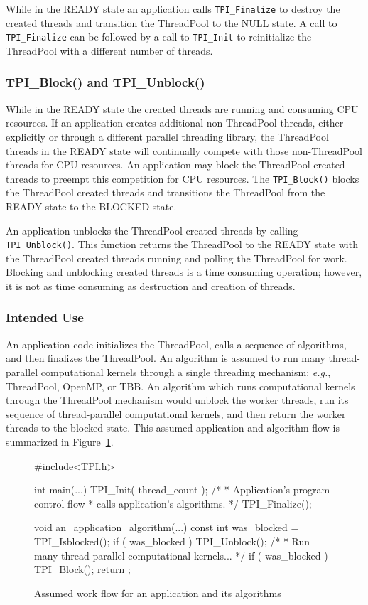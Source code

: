 While in the READY state an application calls \texttt{TPI\_Finalize} to destroy the created threads and transition the ThreadPool to the NULL state.
%
A call to \texttt{TPI\_Finalize} can be followed by a call to \texttt{TPI\_Init} to reinitialize the ThreadPool with a different number of threads.


\subsubsection{TPI\_Block() and TPI\_Unblock()}

While in the READY state the created threads are running and consuming CPU resources.
%
If an application creates additional non-ThreadPool threads, either explicitly or through a different parallel threading library, the ThreadPool threads in the READY state will continually compete with those non-ThreadPool threads for CPU resources.
%
An application may block the ThreadPool created threads to preempt this competition for CPU resources.
%
The \texttt{TPI\_Block()} blocks the ThreadPool created threads and transitions the ThreadPool from the READY state to the BLOCKED state.


An application unblocks the ThreadPool created threads by calling \texttt{TPI\_Unblock()}.
%
This function returns the ThreadPool to the READY state with the ThreadPool created threads running and polling the ThreadPool for work.
%
Blocking and unblocking created threads is a time consuming operation; however, it is not as time consuming as destruction and creation of threads.


\subsubsection{Intended Use}

An application code initializes the ThreadPool, calls a sequence of algorithms, and then finalizes the ThreadPool.
%
An algorithm is assumed to run many thread-parallel computational kernels through a single threading mechanism; \emph{e.g.}, ThreadPool, OpenMP, or TBB.
%
An algorithm which runs computational kernels through the ThreadPool mechanism would unblock the worker threads, run its sequence of thread-parallel computational kernels, and then return the worker threads to the blocked state.
%
This assumed application and algorithm flow is summarized in Figure~\ref{fig:WorkFlow}.

\begin{figure}[h]
\center
\small
\begin{boxedverbatim}
#include<TPI.h>

int main(...)
{
  TPI_Init( thread_count );
  /*
   *  Application's program control flow
   *  calls application's algorithms.
   */
  TPI_Finalize();
}

void an_application_algorithm(...)
{
  const int was_blocked = TPI_Isblocked();
  if ( was_blocked ) TPI_Unblock();
  /*
   *  Run many thread-parallel computational kernels...
   */
  if ( was_blocked ) TPI_Block();
  return ;
}
\end{boxedverbatim}
\caption{Assumed work flow for an application and its algorithms}
\label{fig:WorkFlow}
\end{figure}


